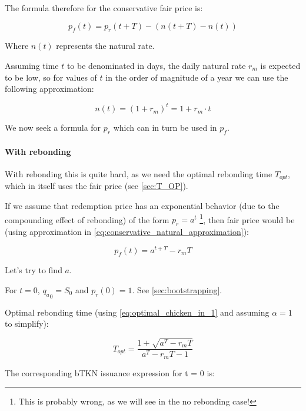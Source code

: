 \documentclass{article}
\begin{document}
The formula therefore for the conservative fair price is:

\begin{equation}
  \label{eq:conservative-1}
p_f(t) = p_r(t + T) - (n(t+T) - n(t))
\end{equation}

Where $n(t)$ represents the natural rate.

Assuming time $t$ to be denominated in days, the daily natural rate $r_m$ is expected to be low, so for values of $t$ in the order of magnitude of a year we can use the following approximation:

\begin{equation}
  \label{eq:conservative_natural_approximation}
n(t) = (1 + r_m)^t = 1 + r_m \cdot t
\end{equation}

We now seek a formula for $p_r$ which can in turn be used in $p_f$. 

\paragraph{With rebonding}
With rebonding this is quite hard, as we need the optimal rebonding time $T_{opt}$, which in itself uses the fair price (see \ref{sec:T_OP}).

If we assume that redemption price has an exponential behavior (due to the compounding effect of rebonding) of the form $p_r = a^t$ \footnote{This is probably wrong, as we will see in the no rebonding case!}, then fair price would be (using approximation in \ref{eq:conservative_natural_approximation}):

\begin{equation}
  \label{eq:conservative-2}
p_f(t) = a^{t+T} - r_m T
\end{equation}

Let’s try to find $a$.

For $t=0$, ${q_a}_0 = S_0$ and $p_r(0) = 1$. See \ref{sec:bootstrapping}.

Optimal rebonding time (using \ref{eq:optimal_chicken_in_1} and assuming $\alpha = 1$ to simplify):

\begin{equation}
  \label{eq:conservative_T_OP}
T_{opt} = \frac{1+ \sqrt{a^T - r_mT}}{a^T - r_mT - 1}
\end{equation}

The corresponding bTKN issuance expression for t = 0 is:
\end{document}
